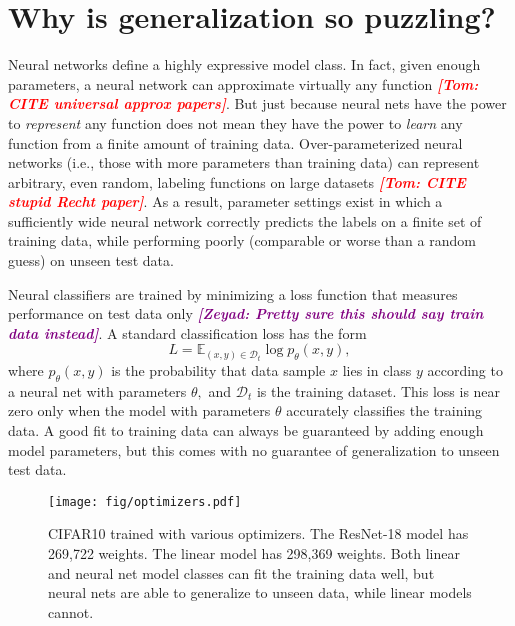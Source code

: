 \documentclass{article}
\newcommand{\tom}[1]{{  \textcolor{red}{\bf \em [Tom: #1]}}}
\newcommand{\zeyad}[1]{{  \textcolor{purple}{\bf \em [Zeyad: #1]}}}
\begin{document}
   \section{Why is generalization so puzzling?}
    Neural networks define a highly expressive model class.  In fact, given enough parameters, a neural network can approximate virtually any function \tom{CITE universal approx papers}.  But just because neural nets have the power to {\em represent} any function does not mean they have the power to {\em learn} any function from a finite amount of training data.   Over-parameterized neural networks (i.e., those with more parameters than training data) can represent arbitrary, even random, labeling functions on large datasets \tom{CITE stupid Recht paper}.  As a result, parameter settings exist in which a sufficiently wide neural network correctly predicts the labels on a finite set of training data, while performing poorly (comparable or worse than a random guess) on unseen test data.

     Neural classifiers are trained by minimizing a loss function that measures performance on test data only \zeyad{Pretty sure this should say \textbf{train data} instead}.   A standard classification loss has the form
       \begin{equation}
        L = \mathbb{E}_{(x,y)\in \mathcal{D}_{t}} \log p_{\theta}(x,y),     \label{loss}
    \end{equation}
where $p_{\theta}(x,y)$ is the probability that data sample $x$ lies in class $y$ according to a neural net with parameters $\theta,$ and $ \mathcal{D}_{t}$ is the training dataset.  This loss is near zero only when the model with parameters $\theta$ accurately classifies the training data. A good fit to training data can always be guaranteed by adding enough model parameters, but this comes with no guarantee of generalization to unseen test data.



    \begin{wrapfigure}[22]{r}{0.5\textwidth}
        \centering
            \centering \texttt{[image: fig/optimizers.pdf]}
        \caption{\small CIFAR10 trained with various optimizers. The ResNet-18 model has 269,722 weights. The linear model has 298,369 weights. Both linear and neural net model classes can fit the training data well, but neural nets are able to generalize to unseen data, while linear models cannot.}
        \label{fig:cifar10-optimizer-comparaison}
    \end{wrapfigure}
\end{document}
